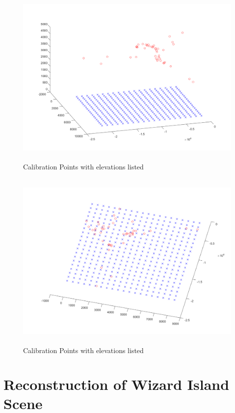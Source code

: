 \documentclass[11pt,psfig]{article}
\begin{document}
\begin{figure}[H]
\centering
\includegraphics[height=3.5in]{sfmResults1/triangulationAttemptSIFT3.png}
\caption{Calibration Points with elevations listed}
\end{figure}
\begin{figure}[H]
\centering
\includegraphics[height=3.5in]{sfmResults1/triangulationAttemptSIFT4.png}
\caption{Calibration Points with elevations listed}
\end{figure}

\section{Reconstruction of Wizard Island Scene}


\end{document}
